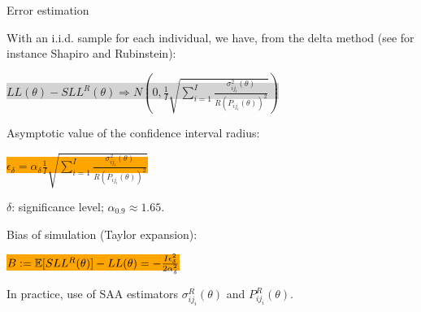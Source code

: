 \documentclass[aspectratio=169]{beamer}
\begin{document}
\begin{frame}{Error estimation}
		
		
		\begin{footnotesize}
			
			With an i.i.d. sample for each individual, we have, from the delta
			method (see for instance Shapiro and Rubinstein):
			\begin{center}
				\colorbox{lightgray}{
					$LL(\theta) - SLL^R(\theta) \Rightarrow N \left(0, \frac{1}{I}
					\sqrt{ \sum_{i = 1}^I \frac{ \sigma^2_{ij_i} (\theta)}
						{R \left( P_{ij_i} (\theta) \right)^2 }} \right)$
				}
			\end{center}
			
			Asymptotic value of the confidence interval radius:
			\begin{center}
				\colorbox{orange}{
					$\epsilon_{\delta} = \alpha_{\delta} \frac{1}{I} \sqrt{ \sum_{i=1}^I
						\frac{ \sigma^2_{ij_i}\left(\theta \right) }
						{R \left( P_{ij_i} (\theta) \right)^2} }$
				}
			\end{center}
			$\delta$: significance level; $\alpha_{0.9} \approx 1.65$.
			
				Bias of simulation (Taylor expansion):
				\begin{center}
					\colorbox{orange}{
						$B := {\mathbb{E}}[SLL^R(\theta)] - LL(\theta) =
						-\frac{I\epsilon_{\delta}^2}{2\alpha_{\delta}^2}$
					}
				\end{center}
				
				In practice, use of SAA estimators $\sigma^R_{ij_i}(\theta)$ and $P^R_{ij_i}(\theta)$.
			
		\end{footnotesize}
		
\end{frame}
\end{document}
